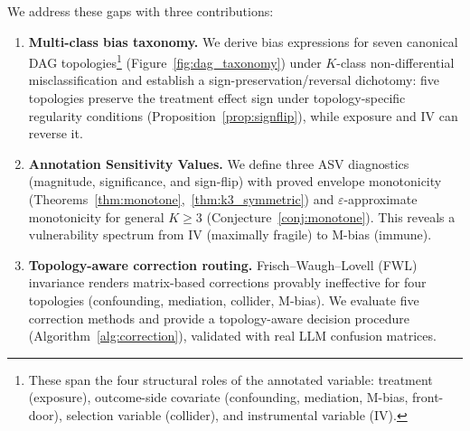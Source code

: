 We address these gaps with three contributions:

\begin{enumerate}
\item \textbf{Multi-class bias taxonomy.} We derive bias expressions for seven canonical DAG topologies\footnote{These span the four structural roles of the annotated variable: treatment (exposure), outcome-side covariate (confounding, mediation, M-bias, front-door), selection variable (collider), and instrumental variable (IV).} (Figure~\ref{fig:dag_taxonomy}) under $K$-class non-differential misclassification and establish a sign-preservation/reversal dichotomy: five topologies preserve the treatment effect sign under topology-specific regularity conditions (Proposition~\ref{prop:signflip}), while exposure and IV can reverse it.

\item \textbf{Annotation Sensitivity Values.} We define three ASV diagnostics (magnitude, significance, and sign-flip) with proved envelope monotonicity (Theorems~\ref{thm:monotone},~\ref{thm:k3_symmetric}) and $\varepsilon$-approximate monotonicity for general $K{\geq}3$ (Conjecture~\ref{conj:monotone}). This reveals a vulnerability spectrum from IV (maximally fragile) to M-bias (immune).

\item \textbf{Topology-aware correction routing.} Frisch--Waugh--Lovell (FWL) invariance renders matrix-based corrections provably ineffective for four topologies (confounding, mediation, collider, M-bias). We evaluate five correction methods and provide a topology-aware decision procedure (Algorithm~\ref{alg:correction}), validated with real LLM confusion matrices.
\end{enumerate}
